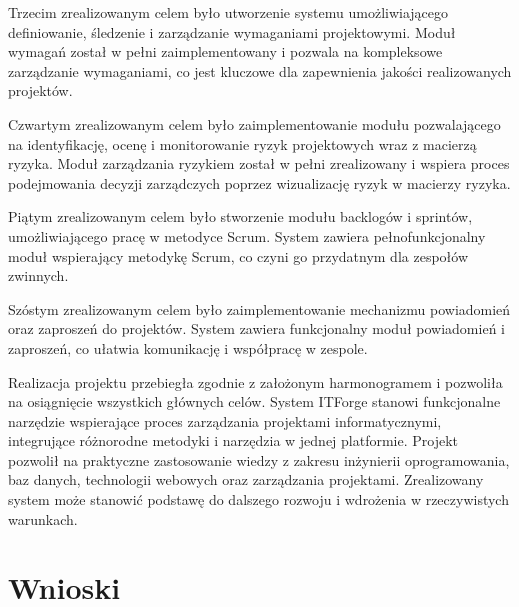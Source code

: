 Trzecim zrealizowanym celem było utworzenie systemu umożliwiającego definiowanie, śledzenie i zarządzanie wymaganiami projektowymi. Moduł wymagań został w pełni zaimplementowany i pozwala na kompleksowe zarządzanie wymaganiami, co jest kluczowe dla zapewnienia jakości realizowanych projektów.

Czwartym zrealizowanym celem było zaimplementowanie modułu pozwalającego na identyfikację, ocenę i monitorowanie ryzyk projektowych wraz z macierzą ryzyka. Moduł zarządzania ryzykiem został w pełni zrealizowany i wspiera proces podejmowania decyzji zarządczych poprzez wizualizację ryzyk w macierzy ryzyka.

Piątym zrealizowanym celem było stworzenie modułu backlogów i sprintów, umożliwiającego pracę w metodyce Scrum. System zawiera pełnofunkcjonalny moduł wspierający metodykę Scrum, co czyni go przydatnym dla zespołów zwinnych.

Szóstym zrealizowanym celem było zaimplementowanie mechanizmu powiadomień oraz zaproszeń do projektów. System zawiera funkcjonalny moduł powiadomień i zaproszeń, co ułatwia komunikację i współpracę w zespole.

Realizacja projektu przebiegła zgodnie z założonym harmonogramem i pozwoliła na osiągnięcie wszystkich głównych celów. System ITForge stanowi funkcjonalne narzędzie wspierające proces zarządzania projektami informatycznymi, integrujące różnorodne metodyki i narzędzia w jednej platformie. Projekt pozwolił na praktyczne zastosowanie wiedzy z zakresu inżynierii oprogramowania, baz danych, technologii webowych oraz zarządzania projektami. Zrealizowany system może stanowić podstawę do dalszego rozwoju i wdrożenia w rzeczywistych warunkach.

\section{Wnioski}


